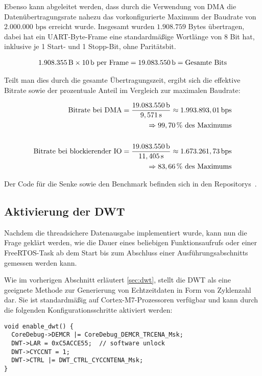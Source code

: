 Ebenso kann abgeleitet werden, dass durch die Verwendung von DMA die
Datenübertragungsrate nahezu das vorkonfigurierte Maximum der Baudrate von
$2.000.000\text{ bps}$ erreicht wurde. Insgesamt wurden $1.908.759$ Bytes
übertragen, dabei hat ein UART-Byte-Frame eine standardmäßige Wortlänge von 8
Bit hat, inklusive je 1 Start- und 1 Stopp-Bit, ohne Paritätsbit.

\begin{align*}
    1.908.355\text{\,B} \times 10\text{\,b per Frame} =
    19.083.550 \text{\,b} = \text{Gesamte Bits}
\end{align*}

Teilt man dies durch die gesamte Übertragungszeit, ergibt sich die effektive
Bitrate sowie der prozentuale Anteil im Vergleich zur maximalen Baudrate:

\begin{align*}
    \text{Bitrate bei DMA} =
    \frac{19.083.550\text{\,b}}{9,571\text{\,s}} \approx
    1.993.893,01 \text{\,bps} \\
    \quad \Rightarrow 99,70\,\%\text{ des Maximums} \\
    \\
    \text{Bitrate bei blockierender IO} =
    \frac{19.083.550\text{\,b}}{11,405\text{\,s}} \approx
    1.673.261,73 \text{\,bps} \\
    \quad \Rightarrow 83,66\,\% \text{ des Maximums}
\end{align*}

Der Code für die Senke sowie den Benchmark befinden sich in den
Repositorys~\cite{freertos_threadsafe_sink, freertos_tsink_benchmark}.

\subsection{Aktivierung der DWT}

Nachdem die threadsichere Datenausgabe implementiert wurde, kann nun die Frage
geklärt werden, wie die Dauer eines beliebigen Funktionsaufrufs oder einer
FreeRTOS-Task ab dem Start bis zum Abschluss einer Ausführungsabschnitts
gemessen werden kann.

Wie im vorherigen Abschnitt erläutert \ref{sec:dwt}, stellt die DWT als eine
geeignete Methode zur Generierung von Echtzeitdaten in Form von Zyklenzahl dar.
Sie ist standardmäßig auf Cortex-M7-Prozessoren verfügbar und kann durch die
folgenden Konfigurationsschritte aktiviert werden:

\begin{code}
\begin{verbatim}
void enable_dwt() {
  CoreDebug->DEMCR |= CoreDebug_DEMCR_TRCENA_Msk;
  DWT->LAR = 0xC5ACCE55;  // software unlock
  DWT->CYCCNT = 1;
  DWT->CTRL |= DWT_CTRL_CYCCNTENA_Msk;
}
\end{verbatim}
\end{code}

